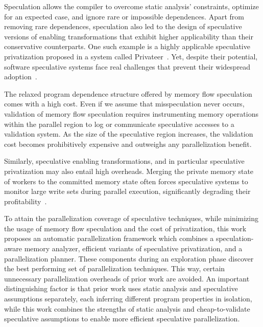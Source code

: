 Speculation allows the compiler to overcome static analysis'
constraints, optimize for an expected case, and ignore rare or
impossible dependences.  Apart from removing rare dependences,
speculation also led to the design of speculative versions of enabling
transformations that exhibit higher applicability than their
conservative counterparts.  One such example is a highly applicable
speculative privatization proposed in a system called
Privateer~\cite{johnson:12:pldi}.
%
Yet, despite their potential, software speculative systems face real
challenges that prevent their widespread
adoption~\cite{cascaval:08:stmtoy:short, .., ..}.
%

The relaxed program dependence structure offered by memory flow
speculation comes with a high cost.  Even if we assume that
misspeculation never occurs, validation of memory flow speculation
requires instrumenting memory operations within the parallel region to
log or communicate speculative accesses to a validation system. As the
size of the speculative region increases, the validation cost becomes
prohibitively expensive and outweighs any parallelization benefit.

Similarly, speculative enabling transformations, and
in particular speculative privatization may also entail high
overheads.  Merging the private memory state of workers to the
committed memory state often forces speculative systems to monitor
large write sets during parallel execution, significantly degrading
their profitability~\cite{kim:12:cgo,johnson:12:pldi}.

To attain the parallelization coverage of speculative techniques,
while minimizing the usage of memory flow speculation and the cost of
privatization,
%
this work proposes an automatic parallelization framework which
combines a speculation-aware memory analyzer, efficient variants of
speculative privatization, and a parallelization planner. These
components during an exploration phase discover the best performing
set of parallelization techniques. This way, certain unnecessary
parallelization overheads of prior work are avoided.
%
An important distinguishing factor is that prior work uses static
analysis and speculative assumptions separately, each inferring
different program properties in isolation, while this work combines
the strengths of static analysis and cheap-to-validate speculative
assumptions to enable more efficient speculative parallelization.

